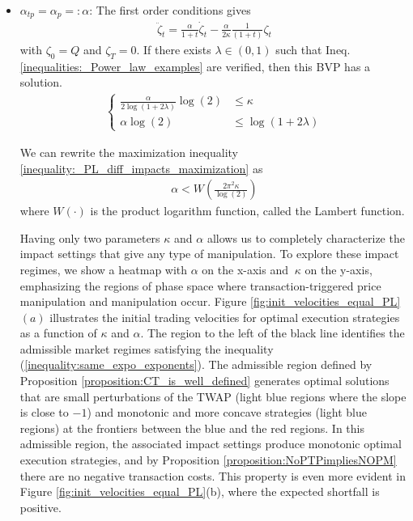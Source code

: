 \documentclass[final,3p,authoryear,12pt]{elsarticle}
\begin{document}
\begin{itemize}
\item \underline{$\alpha_{tp} = \alpha_{p}=:\alpha$}:
The first order conditions gives
\begin{eqnarray}
    \ddot \zeta_{t} = \frac{\alpha}{1+t}\dot \zeta_{t} - \frac{\alpha}{2\kappa}\frac{1}{(1+t)}\zeta_{t}
\end{eqnarray}
with $\zeta_{0} = Q$ and $\zeta_{T} = 0$.
If there exists $\lambda \in (0,1)$ such that Ineq. \ref{inequalities:_Power_law_examples} are verified, then this BVP has a solution. 
\begin{align}
\label{inequalities:_Power_law_examples}
        \begin{cases}
            \frac{\alpha}{2\log(1+2\lambda)}\log(2) &\le  \kappa \\ 
            \alpha\log(2) &\le \log(1+2\lambda)
        \end{cases}
\end{align}

We can rewrite the maximization inequality \ref{inequality:_PL_diff_impacts_maximization} as
\begin{eqnarray}
\label{inequality:_PL_same_impacts_maximization}
    \alpha < W\left(\frac{2\pi^{2}\kappa}{\log(2)}\right)
\end{eqnarray}
where $W(\cdot)$ is the product logarithm function, called the Lambert function. 


Having only two parameters $\kappa$ and $\alpha$ allows us to completely characterize the impact settings that give any type of manipulation. To explore these impact regimes, we show a heatmap with \(\alpha\) on the x-axis and \(\ \kappa\) on the y-axis, emphasizing the regions of phase space where transaction-triggered price manipulation and manipulation occur. Figure \ref{fig:init_velocities_equal_PL} $(a)$ illustrates the initial trading velocities for optimal execution strategies as a function of  $\kappa$ and $\alpha$. The  region to the left of the black line identifies the admissible market regimes satisfying the inequality (\ref{inequality:same_expo_exponents}). The admissible region defined by Proposition \ref{proposition:CT_is_well_defined} generates optimal solutions that are small perturbations of the TWAP (light blue regions where the slope is close to $-1$) and monotonic and more concave strategies (light blue regions) at the frontiers between the blue and the red regions. In this admissible region, the associated impact settings produce monotonic optimal execution strategies, and by Proposition \ref{proposition:NoPTPimpliesNOPM} there are no negative transaction costs. This property is even more evident in Figure \ref{fig:init_velocities_equal_PL}(b), where the expected shortfall is positive.


\end{itemize}
\end{document}
